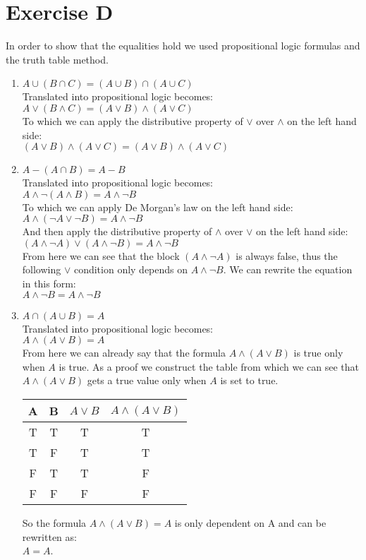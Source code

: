 \section{Exercise D}
In order to show that the equalities hold we used propositional logic formulas and the truth table method.

\begin{enumerate}[label=\alph*)]

\item $ A \cup (B \cap C) = (A \cup B) \cap (A \cup C) $ \\
Translated into propositional logic becomes: \\ 
$ A \lor (B \land C) = (A \lor B) \land (A \lor C) $ \\
To which we can apply the distributive property of $\lor$ over $\land$ on the left hand side: \\
$ (A \lor B) \land (A \lor C) = (A \lor B) \land (A \lor C) $

\item $ A-(A \cap B) = A-B $ \\
Translated into propositional logic becomes: \\
$ A \land \neg(A \land B) = A \land \neg B $ \\
To which we can apply De Morgan's law on the left hand side: \\
$ A \land (\neg A \lor \neg B) = A \land \neg B $ \\
And then apply the distributive property of $\land$ over $\lor$ on the left hand side: \\
$ (A \land \neg A) \lor (A \land \neg B) = A \land \neg B $ \\
From here we can see that the block $(A \land \neg A)$ is always false, thus the following $\lor$ condition only depends on $A \land \neg B$. We can rewrite the equation in this form: \\
$ A \land \neg B = A \land \neg B $ 

\item $ A \cap (A \cup B) = A $  \\
Translated into propositional logic becomes: \\
$ A \land (A \lor B) = A $ \\
From here we can already say that the formula $A \land (A \lor B)$ is true only when $A$ is true. As a proof we construct the table from which we can see that $A \land (A \lor B)$ gets a true value only when $A$ is set to true.

\begin{center}
\begin{tabular}{ |c|c||c|c| } 
\hline
A & B & $A \lor B$ & $A \land (A \lor B)$  \\
\hline
\hline
T & T & T & T\\
\hline
T & F & T & T\\
\hline
F & T & T & F\\
\hline
F & F & F & F\\
\hline
\end{tabular}
\end{center}

 So the formula $A \land (A \lor B) = A$ is only dependent on A and can be rewritten as: \\
 $A=A$.
 
\end{enumerate}
